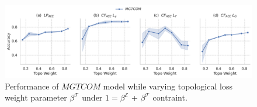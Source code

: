 \begin{figure}[ht!]
\centering

\includegraphics[width=\columnwidth]{resources/figs/abl_beta_topo.pdf}

\caption{
Performance of $MGTCOM$ model while varying topological loss weight parameter $\beta^{\mathcal{T}}$ under $1 = \beta^{\mathcal{E}}$ + $\beta^{\mathcal{T}}$ contraint.
}
\label{fig:abl_beta}
\end{figure}